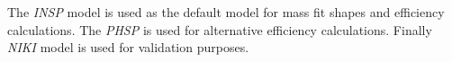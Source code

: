 The \textit{INSP} model is used as the default model for mass fit shapes and efficiency calculations. The \textit{PHSP} is used for alternative efficiency calculations. Finally \textit{NIKI} model is used for validation purposes.

%
%




